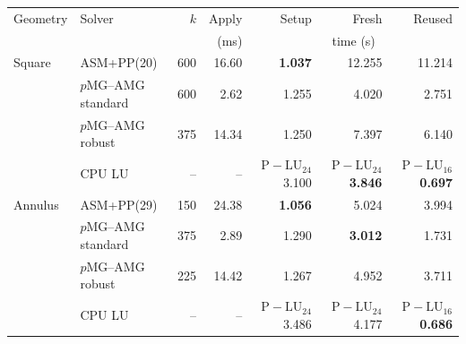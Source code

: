 \begin{tabular}{llrrrrr}
\toprule
Geometry & Solver & $k$ & Apply & Setup & Fresh & Reused \\
 & & & (ms) & \multicolumn{3}{c}{time (s)} \\
\midrule
Square & ASM+PP(20) & 600 & 16.60 & \textbf{1.037} & 12.255 & 11.214 \\
 & $p$MG--AMG standard & 600 & 2.62 & 1.255 & 4.020 & 2.751 \\
 & $p$MG--AMG robust & 375 & 14.34 & 1.250 & 7.397 & 6.140 \\
 & CPU LU & -- & -- & $\mathrm{P\!-\!LU}_{24}$ 3.100 & \textbf{$\mathrm{P\!-\!LU}_{24}$ 3.846} & \textbf{$\mathrm{P\!-\!LU}_{16}$ 0.697} \\
\midrule
Annulus & ASM+PP(29) & 150 & 24.38 & \textbf{1.056} & 5.024 & 3.994 \\
 & $p$MG--AMG standard & 375 & 2.89 & 1.290 & \textbf{3.012} & 1.731 \\
 & $p$MG--AMG robust & 225 & 14.42 & 1.267 & 4.952 & 3.711 \\
 & CPU LU & -- & -- & $\mathrm{P\!-\!LU}_{24}$ 3.486 & $\mathrm{P\!-\!LU}_{24}$ 4.177 & \textbf{$\mathrm{P\!-\!LU}_{16}$ 0.686} \\
\bottomrule
\end{tabular}
